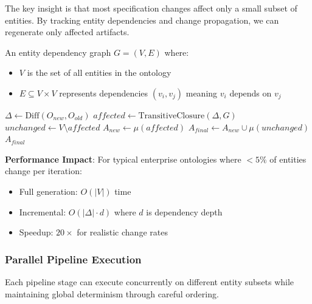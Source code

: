The key insight is that most specification changes affect only a small subset of entities. By tracking entity dependencies and change propagation, we can regenerate only affected artifacts.

\begin{definition}
    An entity dependency graph $G = (V, E)$ where:
    \begin{itemize}
        \item $V$ is the set of all entities in the ontology
        \item $E \subseteq V \times V$ represents dependencies $(v_i, v_j)$ meaning $v_i$ depends on $v_j$
    \end{itemize}
\end{definition}

\begin{algorithm}
\caption{Incremental Generation}
\begin{algorithmic}[1]
    \State $\Delta \gets \text{Diff}(O_{new}, O_{old})$ 
    \State $affected \gets \text{TransitiveClosure}(\Delta, G)$ 
    \State $unchanged \gets V \setminus affected$
    \State $A_{new} \gets \mu(affected)$ 
    \State $A_{final} \gets A_{new} \cup \mu(unchanged)$ 
    \State \Return $A_{final}$
\EndProcedure
\end{algorithmic}
\end{algorithm}

\textbf{Performance Impact}: For typical enterprise ontologies where $<5\%$ of entities change per iteration:
\begin{itemize}
    \item Full generation: $O(|V|)$ time
    \item Incremental: $O(|\Delta| \cdot d)$ where $d$ is dependency depth
    \item Speedup: $20\times$ for realistic change rates
\end{itemize}

\subsubsection{Parallel Pipeline Execution}

Each pipeline stage can execute concurrently on different entity subsets while maintaining global determinism through careful ordering.


